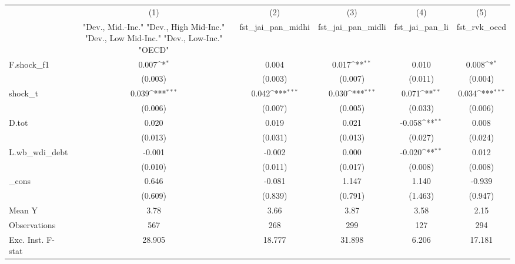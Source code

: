 {
\def\sym#1{\ifmmode^{#1}\else\(^{#1}\)\fi}
\begin{tabular}{l*{5}{c}}
\toprule
            &\multicolumn{1}{c}{(1)}&\multicolumn{1}{c}{(2)}&\multicolumn{1}{c}{(3)}&\multicolumn{1}{c}{(4)}&\multicolumn{1}{c}{(5)}\\
            &\multicolumn{1}{c}{ "Dev., Mid.-Inc." "Dev., High Mid-Inc." "Dev., Low Mid-Inc." "Dev., Low-Inc." "OECD" }&\multicolumn{1}{c}{fst\_jai\_pan\_midhi}&\multicolumn{1}{c}{fst\_jai\_pan\_midli}&\multicolumn{1}{c}{fst\_jai\_pan\_li}&\multicolumn{1}{c}{fst\_rvk\_oecd}\\
\midrule
F.shock\_f1  &       0.007\sym{*}  &       0.004         &       0.017\sym{**} &       0.010         &       0.008\sym{*}  \\
            &     (0.003)         &     (0.003)         &     (0.007)         &     (0.011)         &     (0.004)         \\
\addlinespace
shock\_t     &       0.039\sym{***}&       0.042\sym{***}&       0.030\sym{***}&       0.071\sym{**} &       0.034\sym{***}\\
            &     (0.006)         &     (0.007)         &     (0.005)         &     (0.033)         &     (0.006)         \\
\addlinespace
D.tot       &       0.020         &       0.019         &       0.021         &      -0.058\sym{**} &       0.008         \\
            &     (0.013)         &     (0.031)         &     (0.013)         &     (0.027)         &     (0.024)         \\
\addlinespace
L.wb\_wdi\_debt&      -0.001         &      -0.002         &       0.000         &      -0.020\sym{**} &       0.012         \\
            &     (0.010)         &     (0.011)         &     (0.017)         &     (0.008)         &     (0.008)         \\
\addlinespace
\_cons      &       0.646         &      -0.081         &       1.147         &       1.140         &      -0.939         \\
            &     (0.609)         &     (0.839)         &     (0.791)         &     (1.463)         &     (0.947)         \\
\midrule
Mean Y      &        3.78         &        3.66         &        3.87         &        3.58         &        2.15         \\
Observations&         567         &         268         &         299         &         127         &         294         \\
Exc. Inst. F-stat&      28.905         &      18.777         &      31.898         &       6.206         &      17.181         \\
\bottomrule
\end{tabular}
}
